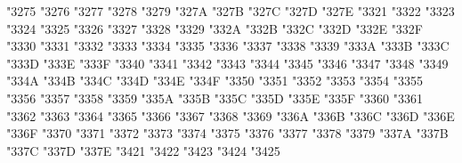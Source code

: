{\Uchar\jis"3275 %
\Uchar\jis"3276 %
\Uchar\jis"3277 %
\Uchar\jis"3278 %
\Uchar\jis"3279 %
\Uchar\jis"327A %
\Uchar\jis"327B %
\Uchar\jis"327C %
\Uchar\jis"327D %
\Uchar\jis"327E %
\Uchar\jis"3321 %
\Uchar\jis"3322 %
\Uchar\jis"3323 %
\Uchar\jis"3324 %
\Uchar\jis"3325 %
\Uchar\jis"3326 %
\Uchar\jis"3327 %
\Uchar\jis"3328 %
\Uchar\jis"3329 %
\Uchar\jis"332A %
\Uchar\jis"332B %
\Uchar\jis"332C %
\Uchar\jis"332D %
\Uchar\jis"332E %
\Uchar\jis"332F %
\Uchar\jis"3330 %
\Uchar\jis"3331 %
\Uchar\jis"3332 %
\Uchar\jis"3333 %
\Uchar\jis"3334 %
\Uchar\jis"3335 %
\Uchar\jis"3336 %
\Uchar\jis"3337 %
\Uchar\jis"3338 %
\Uchar\jis"3339 %
\Uchar\jis"333A %
\Uchar\jis"333B %
\Uchar\jis"333C %
\Uchar\jis"333D %
\Uchar\jis"333E %
\Uchar\jis"333F %
\Uchar\jis"3340 %
\Uchar\jis"3341 %
\Uchar\jis"3342 %
\Uchar\jis"3343 %
\Uchar\jis"3344 %
\Uchar\jis"3345 %
\Uchar\jis"3346 %
\Uchar\jis"3347 %
\Uchar\jis"3348 %
\Uchar\jis"3349 %
\Uchar\jis"334A %
\Uchar\jis"334B %
\Uchar\jis"334C %
\Uchar\jis"334D %
\Uchar\jis"334E %
\Uchar\jis"334F %
\Uchar\jis"3350 %
\Uchar\jis"3351 %
\Uchar\jis"3352 %
\Uchar\jis"3353 %
\Uchar\jis"3354 %
\Uchar\jis"3355 %
\Uchar\jis"3356 %
\Uchar\jis"3357 %
\Uchar\jis"3358 %
\Uchar\jis"3359 %
\Uchar\jis"335A %
\Uchar\jis"335B %
\Uchar\jis"335C %
\Uchar\jis"335D %
\Uchar\jis"335E %
\Uchar\jis"335F %
\Uchar\jis"3360 %
\Uchar\jis"3361 %
\Uchar\jis"3362 %
\Uchar\jis"3363 %
\Uchar\jis"3364 %
\Uchar\jis"3365 %
\Uchar\jis"3366 %
\Uchar\jis"3367 %
\Uchar\jis"3368 %
\Uchar\jis"3369 %
\Uchar\jis"336A %
\Uchar\jis"336B %
\Uchar\jis"336C %
\Uchar\jis"336D %
\Uchar\jis"336E %
\Uchar\jis"336F %
\Uchar\jis"3370 %
\Uchar\jis"3371 %
\Uchar\jis"3372 %
\Uchar\jis"3373 %
\Uchar\jis"3374 %
\Uchar\jis"3375 %
\Uchar\jis"3376 %
\Uchar\jis"3377 %
\Uchar\jis"3378 %
\Uchar\jis"3379 %
\Uchar\jis"337A %
\Uchar\jis"337B %
\Uchar\jis"337C %
\Uchar\jis"337D %
\Uchar\jis"337E %
\Uchar\jis"3421 %
\Uchar\jis"3422 %
\Uchar\jis"3423 %
\Uchar\jis"3424 %
\Uchar\jis"3425 %
}
